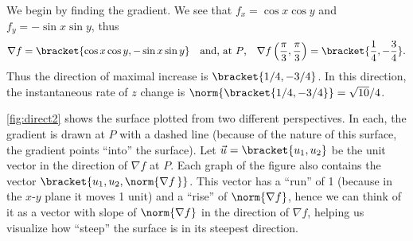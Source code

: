 {We begin by finding the gradient. We see that $f_x = \cos x\cos y$ and $f_y = -\sin x\sin y$, thus 
\[\nabla f =\bracket{\cos x\cos y,-\sin x\sin y}\quad \text{and, at $P$,} \quad \nabla f\left(\frac{\pi}3,\frac{\pi}3\right) =\bracket{\frac14,-\frac34}.\]
Thus the direction of maximal increase is $\bracket{1/4, -3/4}$. In this direction, the instantaneous rate of $z$ change is $\norm{\bracket{1/4,-3/4}} = \sqrt{10}/4%
$. 

\autoref{fig:direct2} shows the surface plotted from two different perspectives. In each, the gradient is drawn at $P$ with a dashed line (because of the nature of this surface, the gradient points ``into'' the surface). Let $\vec u =\bracket{u_1, u_2}$ be the unit vector in the direction of $\nabla f$ at $P$. Each graph of the figure also contains the vector $\bracket{u_1, u_2, \norm{\nabla f\,}}$. This vector has a ``run'' of 1 (because in the $x$-$y$ plane it moves 1 unit) and a ``rise'' of $\norm{\nabla f}$, hence we can think of it as a vector with slope of $\norm{\nabla f}$ in the direction of $\nabla f$, helping us visualize how ``steep'' the surface is in its steepest direction. 


}
